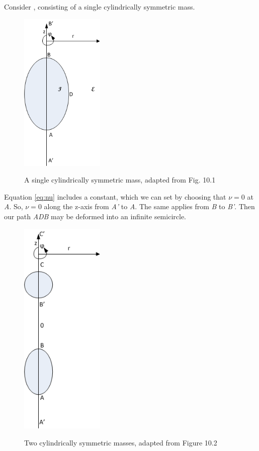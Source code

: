 \documentclass{article}
\begin{document}
Consider , consisting of a single cylindrically symmetric mass.

\begin{figure}
\centering
\caption[A single cylindrically symmetric mass]
{A single cylindrically symmetric mass, adapted from \cite{synge_relativity} Fig. 10.1}
\includegraphics[width=40mm]{Figure1.png}
\label{fig:single-mass}
\end{figure}

Equation \eqref{eq:nu} includes a constant, which we can set by choosing that $\nu=0$ at \emph{A}. So, $\nu=0$ along the z-axis from \emph{A'} to \emph{A}. The same applies from \emph{B} to \emph{B'}. Then our path \emph{ADB} may be deformed into an infinite semicircle.



\begin{figure}
\centering
\caption[Two cylindrically symmetric masses]
{Two cylindrically symmetric masses, adapted from \cite{synge_relativity} Figure 10.2}
\includegraphics[width=40mm]{Figure2.png}
\label{fig:two-masses}
\end{figure}
\end{document}

